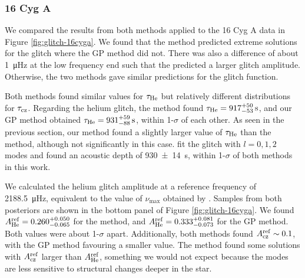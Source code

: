 
\subsubsection{16 Cyg A}

We compared the results from both methods applied to the 16 Cyg A data in Figure \ref{fig:glitch-16cyga}. We found that the  method predicted extreme solutions for the glitch where the GP method did not. There was also a difference of about \SI{1}{\micro\hertz} at the low frequency end such that the  predicted a larger glitch amplitude. Otherwise, the two methods gave similar predictions for the glitch function.

Both methods found similar values for \(\tau_{{\mathrm{He}}}\) but relatively different distributions for \(\tau_{{\mathrm{cz}}}\). Regarding the helium glitch, the  method found \(\tau_{{\mathrm{He}}} = 917_{-53}^{+50} \, \mathrm{s}\), and our GP method obtained \(\tau_{{\mathrm{He}}} = 931_{-88}^{+59} \, \mathrm{s}\), within 1-\(\sigma\) of each other. As seen in the previous section, our method found a slightly larger value of \(\tau_{{\mathrm{He}}}\) than the  method, although not significantly in this case. \citet{Verma.Faria.ea2014} fit the glitch with \(l=0,1,2\) modes and found an acoustic depth of \SI{930(14)}{\second}, within 1-\(\sigma\) of both methods in this work.

We calculated the helium glitch amplitude at a reference frequency of \SI{2188.5}{\micro\hertz}, equivalent to the value of \(\nu_{\max}\) obtained by \citet{Lund.SilvaAguirre.ea2017}. Samples from both posteriors are shown in the bottom panel of Figure \ref{fig:glitch-16cyga}. We found \(A_{{\mathrm{He}}}^\mathrm{ref} = 0.260_{-0.065}^{+0.050}\) for the  method, and \(A_{{\mathrm{He}}}^\mathrm{ref} = 0.333_{-0.073}^{+0.081}\) for the GP method. Both values were about 1-\(\sigma\) apart. Additionally, both methods found \(A_{{\mathrm{cz}}}^\mathrm{ref} \sim 0.1\), with the GP method favouring a smaller value. The  method found some solutions with \(A_{{\mathrm{cz}}}^\mathrm{ref}\) larger than \(A_{{\mathrm{He}}}^\mathrm{ref}\), something we would not expect because the modes are less sensitive to structural changes deeper in the star.


